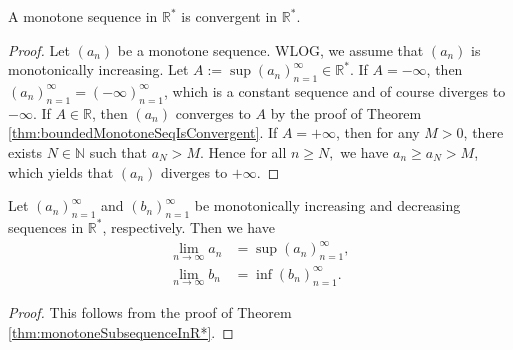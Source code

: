 \begin{thm}
  \label{thm:monotoneSubsequenceInR*}
  A monotone sequence in $\mathbb{R}^*$ is convergent in $\mathbb{R}^*$.
\end{thm}
\begin{proof}
  Let $(a_{n})$ be a monotone sequence.
  WLOG, we assume that $(a_{n})$ is monotonically increasing.
  Let $A:=\sup(a_{n})_{n=1}^{\infty}\in \mathbb{R}^{*}. $
  If $A=-\infty$, then $(a_{n})_{n=1}^{\infty}=(-\infty)_{n=1}^{\infty}$,
  which is a constant sequence and of course diverges to $-\infty$.
  If $A\in \mathbb{R}$, then $(a_{n})$ converges to $A$ by the proof of
  Theorem \ref{thm:boundedMonotoneSeqIsConvergent}.
  If $A=+\infty$, then for any $M>0$,
  there exists $N\in \mathbb{N}$ such that $a_{N}>M$.
  Hence for all $n\ge N,$ we have $a_{n}\ge a_{N}>M$,
  which yields that $(a_{n})$ diverges to $+\infty$.
\end{proof}

\begin{coro}
  \label{coro:theEquivalenceOfMonotoneSequenceLimit}
  Let $(a_{n})_{n=1}^{\infty}$ and $(b_{n})_{n=1}^{\infty}$
  be monotonically increasing and decreasing
  sequences in $\mathbb{R}^{*}$, respectively. Then we have
  \begin{align}
    \lim_{n\rightarrow \infty}a_{n}&=\sup(a_{n})_{n=1}^{\infty},
    \label{eq:monotonicallyIncreasingLimit}
    \\
    \lim_{n\rightarrow \infty}b_{n}&=\inf(b_{n})_{n=1}^{\infty}.
    \label{eq:monotonicallyDecreasingLimit}
  \end{align}
\end{coro}
\begin{proof}
  This follows from the proof of
  Theorem \ref{thm:monotoneSubsequenceInR*}.
\end{proof}

